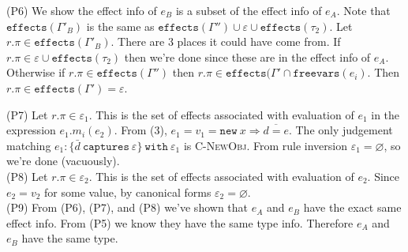 \documentclass{llncs}
\newcommand{\keywadj}[1]{\mathtt{#1}}
\newcommand{\keyw}[1]{\keywadj{#1}~}
\begin{document}
{{{\noindent
(P6) We show the effect info of $e_B$ is a subset of the effect info of $e_A$. Note that $\keywadj{effects}(\Gamma'_B)$ is the same as $\keywadj{effects}(\Gamma'') \cup \varepsilon \cup \keywadj{effects}(\tau_2)$. Let $r.\pi \in \keywadj{effects}(\Gamma'_B)$. There are 3 places it could have come from. If $r.\pi \in \varepsilon \cup \keywadj{effects}(\tau_2)$ then we're done since these are in the effect info of $e_A$. Otherwise if $r.\pi \in \keywadj{effects}(\Gamma'')$ then $r.\pi \in \keywadj{effects}(\Gamma' \cap \keywadj{freevars}(e_i)$. Then $r.\pi \in \keywadj{effects}(\Gamma') = \varepsilon$.

\noindent
(P7) Let $r.\pi \in \varepsilon_1$. This is the set of effects associated with evaluation of $e_1$ in the expression $e_1.m_i(e_2)$. From (3), $e_1 = v_1 = \keyw{new} x \Rightarrow \overline{d = e}$. The only judgement matching $e_1 : \{ \bar d~\keyw{captures} \varepsilon \}~\keyw{with} \varepsilon_1$ is \textsc{C-NewObj}. From rule inversion $\varepsilon_1 = \varnothing$, so we're done (vacuously). \\

\noindent
(P8) Let $r.\pi \in \varepsilon_2$. This is the set of effects associated with evaluation of $e_2$. Since $e_2 = v_2$ for some value, by canonical forms $\varepsilon_2 = \varnothing$. \\

\noindent
(P9) From (P6), (P7), and (P8) we've shown that $e_A$ and $e_B$ have the exact same effect info. From (P5) we know they have the same type info. Therefore $e_A$ and $e_B$ have the same type.

}
}		
}
\end{document}
